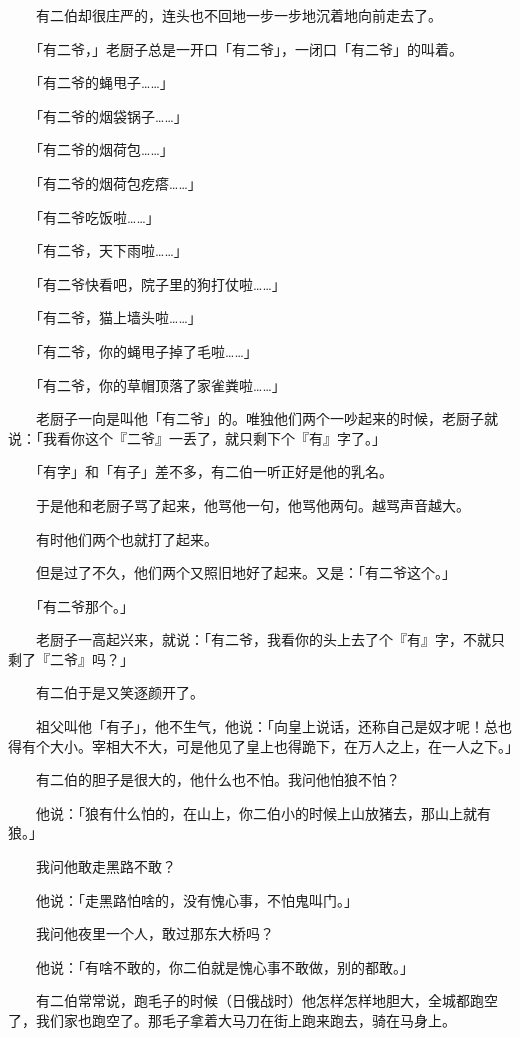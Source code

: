 \documentclass[UTF8]{ctexart}
\begin{document}
　　有二伯却很庄严的，连头也不回地一步一步地沉着地向前走去了。

　　「有二爷，」老厨子总是一开口「有二爷」，一闭口「有二爷」的叫着。

　　「有二爷的蝇甩子……」

　　「有二爷的烟袋锅子……」

　　「有二爷的烟荷包……」

　　「有二爷的烟荷包疙瘩……」

　　「有二爷吃饭啦……」

　　「有二爷，天下雨啦……」

　　「有二爷快看吧，院子里的狗打仗啦……」

　　「有二爷，猫上墙头啦……」

　　「有二爷，你的蝇甩子掉了毛啦……」

　　「有二爷，你的草帽顶落了家雀粪啦……」

　　老厨子一向是叫他「有二爷」的。唯独他们两个一吵起来的时候，老厨子就说：「我看你这个『二爷』一丢了，就只剩下个『有』字了。」

　　「有字」和「有子」差不多，有二伯一听正好是他的乳名。

　　于是他和老厨子骂了起来，他骂他一句，他骂他两句。越骂声音越大。

　　有时他们两个也就打了起来。

　　但是过了不久，他们两个又照旧地好了起来。又是：「有二爷这个。」

　　「有二爷那个。」

　　老厨子一高起兴来，就说：「有二爷，我看你的头上去了个『有』字，不就只剩了『二爷』吗？」

　　有二伯于是又笑逐颜开了。

　　祖父叫他「有子」，他不生气，他说：「向皇上说话，还称自己是奴才呢！总也得有个大小。宰相大不大，可是他见了皇上也得跪下，在万人之上，在一人之下。」

　　有二伯的胆子是很大的，他什么也不怕。我问他怕狼不怕？

　　他说：「狼有什么怕的，在山上，你二伯小的时候上山放猪去，那山上就有狼。」

　　我问他敢走黑路不敢？

　　他说：「走黑路怕啥的，没有愧心事，不怕鬼叫门。」

　　我问他夜里一个人，敢过那东大桥吗？

　　他说：「有啥不敢的，你二伯就是愧心事不敢做，别的都敢。」

　　有二伯常常说，跑毛子的时候（日俄战时）他怎样怎样地胆大，全城都跑空了，我们家也跑空了。那毛子拿着大马刀在街上跑来跑去，骑在马身上。
\end{document}
